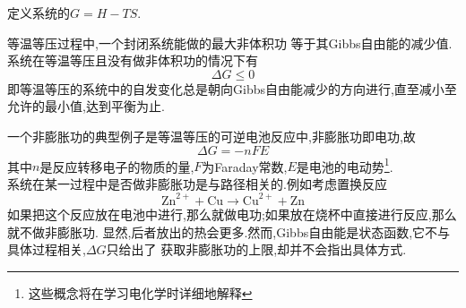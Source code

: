 \documentclass{ctexart}
\begin{document}
\begin{definition}[3E.2.1 Gibbs自由能]
    定义系统的$G=H-TS$.
\end{definition}
\begin{theorem}[3E.2.2 Gibbs自由能用于自发过程的判据]
    等温等压过程中,一个封闭系统能做的最大非体积功%
    等于其Gibbs自由能的减少值.\\
    系统在等温等压且没有做非体积功的情况下有
    \[\Delta G\leqslant0\]
    即等温等压的系统中的自发变化总是朝向Gibbs自由能减少的方向进行,直至减小至%
    允许的最小值,达到平衡为止.
\end{theorem}
一个非膨胀功的典型例子是等温等压的可逆电池反应中,非膨胀功即电功,故
\[\Delta G=-nFE\]
其中$n$是反应转移电子的物质的量,$F$为Faraday常数,$E$是电池的电动势\footnote{这些概念将在学习电化学时详细地解释}.\\
\indent 系统在某一过程中是否做非膨胀功是与路径相关的.例如考虑置换反应
\[\text{Zn}^{2+}+\text{Cu}\longrightarrow\text{Cu}^{2+}+\text{Zn}\]
如果把这个反应放在电池中进行,那么就做电功;如果放在烧杯中直接进行反应,那么就不做非膨胀功.%
显然,后者放出的热会更多.然而,Gibbs自由能是状态函数,它不与具体过程相关,$\Delta G$只给出了%
获取非膨胀功的上限,却并不会指出具体方式.
\end{document}
